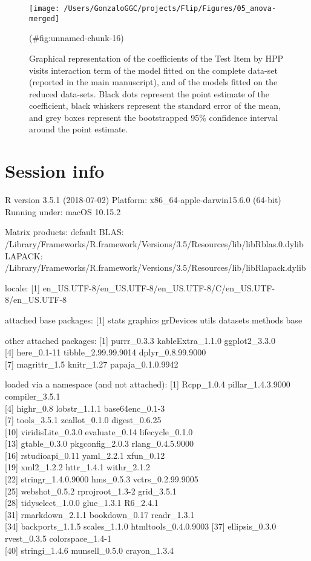 \begin{appendix}
\begin{figure}
\texttt{[image: /Users/GonzaloGGC/projects/Flip/Figures/05\_anova-merged]} \caption{Graphical representation of the coefficients of the Test Item by HPP visits interaction term of the model fitted on the complete data-set (reported in the main manuscript), and of the models fitted on the reduced data-sets. Black dots represent the point estimate of the coefficient, black whiskers represent the standard error of the mean, and grey boxes represent the bootstrapped 95\% confidence interval around the point estimate.}(\#fig:unnamed-chunk-16)
\end{figure}

\hypertarget{session-info}{%
\section{Session info}\label{session-info}}

R version 3.5.1 (2018-07-02) Platform: x86\_64-apple-darwin15.6.0
(64-bit) Running under: macOS 10.15.2

Matrix products: default BLAS:
/Library/Frameworks/R.framework/Versions/3.5/Resources/lib/libRblas.0.dylib
LAPACK:
/Library/Frameworks/R.framework/Versions/3.5/Resources/lib/libRlapack.dylib

locale: {[}1{]}
en\_US.UTF-8/en\_US.UTF-8/en\_US.UTF-8/C/en\_US.UTF-8/en\_US.UTF-8

attached base packages: {[}1{]} stats graphics grDevices utils datasets
methods base

other attached packages: {[}1{]} purrr\_0.3.3 kableExtra\_1.1.0
ggplot2\_3.3.0\\
{[}4{]} here\_0.1-11 tibble\_2.99.99.9014 dplyr\_0.8.99.9000\\
{[}7{]} magrittr\_1.5 knitr\_1.27 papaja\_0.1.0.9942

loaded via a namespace (and not attached): {[}1{]} Rcpp\_1.0.4
pillar\_1.4.3.9000 compiler\_3.5.1\\
{[}4{]} highr\_0.8 lobstr\_1.1.1 base64enc\_0.1-3\\
{[}7{]} tools\_3.5.1 zeallot\_0.1.0 digest\_0.6.25\\
{[}10{]} viridisLite\_0.3.0 evaluate\_0.14 lifecycle\_0.1.0\\
{[}13{]} gtable\_0.3.0 pkgconfig\_2.0.3 rlang\_0.4.5.9000\\
{[}16{]} rstudioapi\_0.11 yaml\_2.2.1 xfun\_0.12\\
{[}19{]} xml2\_1.2.2 httr\_1.4.1 withr\_2.1.2\\
{[}22{]} stringr\_1.4.0.9000 hms\_0.5.3 vctrs\_0.2.99.9005\\
{[}25{]} webshot\_0.5.2 rprojroot\_1.3-2 grid\_3.5.1\\
{[}28{]} tidyselect\_1.0.0 glue\_1.3.1 R6\_2.4.1\\
{[}31{]} rmarkdown\_2.1.1 bookdown\_0.17 readr\_1.3.1\\
{[}34{]} backports\_1.1.5 scales\_1.1.0 htmltools\_0.4.0.9003 {[}37{]}
ellipsis\_0.3.0 rvest\_0.3.5 colorspace\_1.4-1\\
{[}40{]} stringi\_1.4.6 munsell\_0.5.0 crayon\_1.3.4


\end{appendix}
